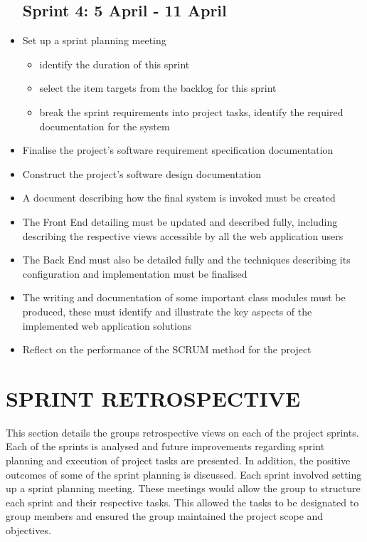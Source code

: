 \documentclass[10pt,twocolumn]{witseiepaper}
\begin{document}
\begin{itemize}
		\subsection{Sprint 4: 5 April - 11 April}
		\item Set up a sprint planning meeting
		\begin{itemize}
			\item identify the duration of this sprint
			\item select the item targets from the backlog for this sprint
			\item break the sprint requirements into project tasks, identify the required documentation for the system
		\end{itemize}
		\item Finalise the project's software requirement specification documentation
		\item Construct the project's software design documentation
		\item A document describing how the final system is invoked must be created
		\item The Front End detailing must be updated and described fully, including describing the respective views accessible by all the web application users
		\item The Back End must also be detailed fully and the techniques describing its configuration and implementation must be finalised
		\item The writing and documentation of some important class modules must be produced, these must identify and illustrate the key aspects of the implemented web application solutions
		\item Reflect on the performance of the SCRUM method for the project
	\end{itemize}	

\section{SPRINT RETROSPECTIVE}

		This section details the groups retrospective views on each of the project sprints. Each of the sprints is analysed and future improvements regarding sprint planning and execution of project tasks are presented. In addition, the positive outcomes of some of the sprint planning is discussed. Each sprint involved setting up a sprint planning meeting. These meetings would allow the group to structure each sprint and their respective tasks. This allowed the tasks to be designated to group members and ensured the group maintained the project scope and objectives.
		
\end{document}
